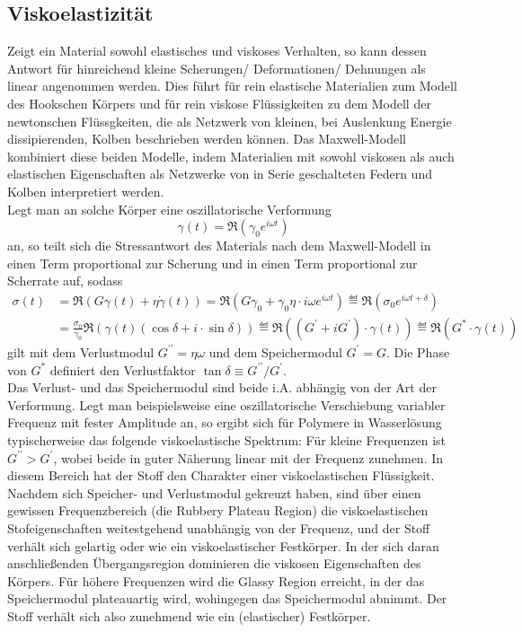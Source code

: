 \documentclass[11pt,a4paper,oneside]{scrartcl}
\begin{document}
\subsection{Viskoelastizität}
Zeigt ein Material sowohl elastisches und viskoses Verhalten, so kann dessen Antwort für hinreichend kleine Scherungen/ Deformationen/ Dehnungen als linear angenommen werden. Dies führt für rein elastische Materialien zum Modell des Hookschen Körpers und für rein viskose Flüssigkeiten zu dem Modell der newtonschen Flüssgkeiten, die als Netzwerk von kleinen, bei Auslenkung Energie dissipierenden, Kolben beschrieben werden können. Das Maxwell-Modell kombiniert diese beiden Modelle, indem Materialien mit sowohl viskosen als auch elastischen Eigenschaften als Netzwerke von in  Serie geschalteten Federn und Kolben interpretiert werden.\\
Legt man an solche Körper eine oszillatorische Verformung 
\begin{equation}
\gamma(t)=\Re\left(\gamma_0 e^{i\omega t}\right)
\end{equation}
an, so teilt sich die Stressantwort des Materials nach dem Maxwell-Modell in einen Term proportional zur Scherung und in einen Term proportional zur Scherrate auf, sodass
\begin{align}
\sigma(t)&=\Re\left(G\gamma(t)+\eta\dot\gamma(t)\right)=\Re\left(G\gamma_0+\gamma_0\eta\cdot i\omega  e^{i\omega t}\right)\eqdef \Re\left(\sigma_0 e^{i\omega t+\delta} \right)\\
\quad& =\frac{\sigma_0}{\gamma_0}\Re\left(\gamma(t)(\cos\delta+i\cdot\sin\delta)\right)\eqdef\Re\left( (G^\prime+iG^\prime)\cdot\gamma(t)\right)\eqdef \Re\left(G^*\cdot\gamma(t)\right)
\end{align}
gilt mit dem Verlustmodul $G^{\prime\prime}=\eta\omega$ und dem Speichermodul $G^\prime=G$. Die Phase von $G^*$ definiert den Verlustfaktor $\tan\delta \equiv G^{\prime\prime}/G^{\prime}$.\\
Das Verlust- und das Speichermodul sind beide i.A. abhängig von der Art der Verformung. Legt man beispielsweise eine oszillatorische Verschiebung variabler Frequenz mit fester Amplitude an, so ergibt sich für Polymere in Wasserlösung typischerweise das folgende viskoelastische Spektrum:
Für kleine Frequenzen ist $G^{\prime\prime}>G^{\prime}$, wobei beide in guter Näherung linear mit der Frequenz zunehmen. In diesem Bereich hat der Stoff den Charakter einer viskoelastischen Flüssigkeit. Nachdem sich Speicher- und Verlustmodul gekreuzt haben, sind über einen gewissen Frequenzbereich (die Rubbery Plateau Region) die viskoelastischen Stofeigenschaften weitestgehend unabhängig von der Frequenz, und der Stoff verhält sich gelartig oder wie ein viskoelastischer Festkörper. In der sich daran anschließenden Übergangsregion dominieren die viskosen Eigenschaften des Körpers. Für höhere Frequenzen wird die Glassy Region erreicht, in der das Speichermodul plateauartig wird, wohingegen das Speichermodul abnimmt. Der Stoff verhält sich also zunehmend wie ein (elastischer) Festkörper.
\end{document}
